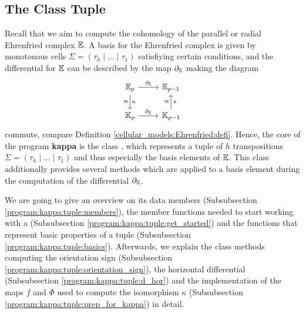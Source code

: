 \subsection{The Class Tuple}
\label{chapter_program:kappa:tuple}

Recall that we aim to compute the cohomology of the parallel or radial Ehrenfried complex $\mathbb E$.
A basis for the Ehrenfried complex is given by monotonous cells $\Sigma = (\tau_h \mid \ldots \mid \tau_1)$ satisfiying certain conditions,
and the differential for $\mathbb E$ can be described by the map $\partial_\mathbb E$ making the diagram
\[
    \begin{tikzcd}
	\E_p \arrow{r}{\del_\E} \arrow{d}{\kappa}[swap]{\cong}      & \E_{p-1} \\
	\KK_p \arrow{r}{\del_\KK}                                     & \KK_{p-1} \arrow{u}{\cong}[swap]{\pi}
    \end{tikzcd}
\]
commute, compare Definition \ref{cellular_models:Ehrenfried:defi}.
Hence, the core of the program \textbf{kappa} is the class , 
which represents a tuple of $h$ transpositions $\Sigma = (\tau_h \mid \ldots \mid \tau_1)$
and thus especially the basis elements of $\mathbb E$.
This class additionally provides several methods which are applied to a basis element during the computation of the differential $\partial_\mathbb E$.

We are going to give an overview on its data members (Subsubsection \ref{program:kappa:tuple:members}),
the member functions needed to start working with a  (Subsubsection \ref{program:kappa:tuple:get_started}) and 
the functions that represent basic properties of a tuple (Subsubsection \ref{program:kappa:tuple:basics}). 
Afterwards, we explain the class methods computing the orientation sign (Subsubsection \ref{program:kappa:tuple:orientation_sign}), 
the horizontal differential (Subsubsection \ref{program:kappa:tuple:d_hor}) and the implementation of the maps $f$ and $\Phi$ used to compute the isomorphism $\kappa$ (Subsubsection \ref{program:kappa:tuple:prep_for_kappa}) in detail. 


